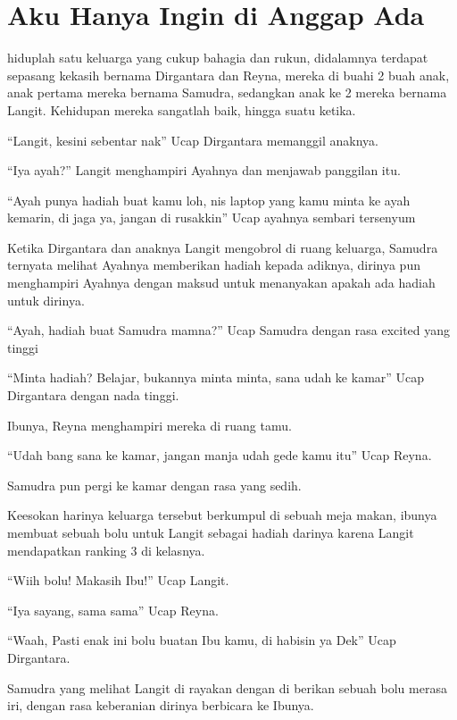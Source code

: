 \chapter*{Aku Hanya Ingin di Anggap Ada}
 hiduplah satu keluarga yang cukup bahagia dan rukun, didalamnya terdapat sepasang kekasih bernama Dirgantara dan Reyna, mereka di buahi 2 buah anak, anak pertama mereka bernama Samudra, sedangkan anak ke 2 mereka bernama Langit. Kehidupan mereka sangatlah baik, hingga suatu ketika.


“Langit, kesini sebentar nak”  Ucap Dirgantara memanggil anaknya.


“Iya ayah?” Langit menghampiri Ayahnya dan menjawab panggilan itu.


“Ayah punya hadiah buat kamu loh, nis laptop yang kamu minta ke ayah kemarin, di jaga ya, jangan di rusakkin” Ucap ayahnya sembari tersenyum


Ketika Dirgantara dan anaknya Langit mengobrol di ruang keluarga, Samudra ternyata melihat Ayahnya memberikan hadiah kepada adiknya, dirinya pun menghampiri Ayahnya dengan maksud untuk menanyakan apakah ada hadiah untuk dirinya.


“Ayah, hadiah buat Samudra mamna?” Ucap Samudra dengan rasa excited yang tinggi


“Minta hadiah? Belajar, bukannya minta minta, sana udah ke kamar” Ucap Dirgantara dengan nada tinggi.


Ibunya, Reyna menghampiri mereka di ruang tamu.


“Udah bang sana ke kamar, jangan manja udah gede kamu itu” Ucap Reyna.


Samudra pun pergi ke kamar dengan rasa yang sedih.


Keesokan harinya keluarga tersebut berkumpul di sebuah meja makan, ibunya membuat sebuah bolu untuk Langit sebagai hadiah darinya karena Langit mendapatkan ranking 3 di kelasnya.


“Wiih bolu! Makasih Ibu!” Ucap Langit.


“Iya sayang, sama sama” Ucap Reyna.


“Waah, Pasti enak ini bolu buatan Ibu kamu, di habisin ya Dek” Ucap Dirgantara.


Samudra yang melihat Langit di rayakan dengan di berikan sebuah bolu merasa iri, dengan rasa keberanian dirinya berbicara ke Ibunya.


